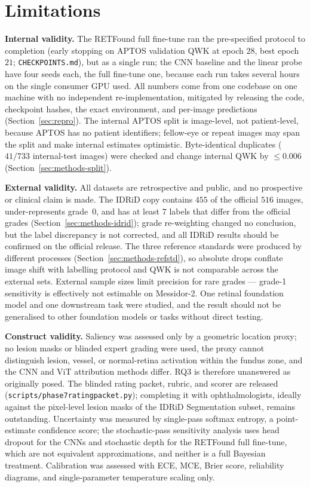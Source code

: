 \documentclass[journal]{IEEEtran}
\renewcommand{\_}{\origunderscore\allowbreak}
\begin{document}
\section{Limitations}
\label{sec:limitations}

\textbf{Internal validity.} The RETFound full fine-tune ran the pre-specified
protocol to completion (early stopping on APTOS validation QWK at epoch $28$,
best epoch $21$; \texttt{CHECKPOINTS.md}), but as a single run; the
CNN baseline and the linear probe have four seeds each, the full fine-tune
one, because each run takes several hours on the single consumer GPU used. All
numbers come from one codebase on one machine with no independent
re-implementation, mitigated by releasing the code, checkpoint hashes, the exact
environment, and per-image predictions (Section~\ref{sec:repro}). The internal
APTOS split is image-level, not patient-level, because APTOS has no patient
identifiers; fellow-eye or repeat images may span the split and make internal
estimates optimistic. Byte-identical duplicates ($41/733$ internal-test images)
were checked and change internal QWK by $\leq 0.006$
(Section~\ref{sec:methods-split}).

\textbf{External validity.} All datasets are retrospective and public, and no
prospective or clinical claim is made. The IDRiD copy contains $455$ of the
official $516$ images, under-represents grade~0, and has at least $7$ labels that
differ from the official grades (Section~\ref{sec:methods-idrid}); grade
re-weighting changed no conclusion, but the label discrepancy is not corrected,
and all IDRiD results should be confirmed on the official release. The three
reference standards were produced by different processes
(Section~\ref{sec:methods-refstd}), so absolute drops conflate image shift with
labelling protocol and QWK is not comparable across the external sets. External
sample sizes limit precision for rare grades --- grade-1 sensitivity is
effectively not estimable on Messidor-2. One retinal foundation model and one
downstream task were studied, and the result should not be generalised to other
foundation models or tasks without direct testing.

\textbf{Construct validity.} Saliency was assessed only by a geometric location
proxy; no lesion masks or blinded expert grading were used, the proxy cannot
distinguish lesion, vessel, or normal-retina activation within the fundus zone,
and the CNN and ViT attribution methods differ. RQ3 is therefore unanswered as
originally posed. The blinded rating packet, rubric, and scorer are released
(\texttt{scripts/\allowbreak{}phase7\_rating\_packet.py}); completing it with
ophthalmologists, ideally against the pixel-level lesion masks of the IDRiD
Segmentation subset, remains outstanding. Uncertainty was measured by single-pass
softmax entropy, a point-estimate confidence score; the stochastic-pass
sensitivity analysis uses head dropout for the CNNs and stochastic depth for the
RETFound full fine-tune, which are not equivalent approximations, and neither is a
full Bayesian treatment. Calibration was assessed with ECE, MCE, Brier score,
reliability diagrams, and single-parameter temperature scaling only.
\end{document}
